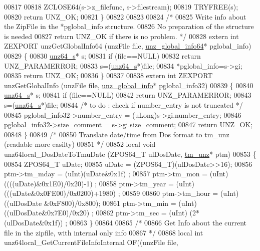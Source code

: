 \begin{DoxyCode}
00817 
00818     ZCLOSE64(s->z\_filefunc, s->filestream);
00819     TRYFREE(s);
00820     \textcolor{keywordflow}{return} UNZ\_OK;
00821 \}
00822 
00823 
00824 \textcolor{comment}{/*}
00825 \textcolor{comment}{  Write info about the ZipFile in the *pglobal\_info structure.}
00826 \textcolor{comment}{  No preparation of the structure is needed}
00827 \textcolor{comment}{  return UNZ\_OK if there is no problem. */}
00828 \textcolor{keyword}{extern} \textcolor{keywordtype}{int} ZEXPORT unzGetGlobalInfo64 (unzFile file, \hyperlink{structunz__global__info64__s}{unz\_global\_info64}* pglobal\_info)
00829 \{
00830     \hyperlink{structunz64__s}{unz64\_s}* s;
00831     \textcolor{keywordflow}{if} (file==NULL)
00832         \textcolor{keywordflow}{return} UNZ\_PARAMERROR;
00833     s=(\hyperlink{structunz64__s}{unz64\_s}*)file;
00834     *pglobal\_info=s->gi;
00835     \textcolor{keywordflow}{return} UNZ\_OK;
00836 \}
00837 
00838 \textcolor{keyword}{extern} \textcolor{keywordtype}{int} ZEXPORT unzGetGlobalInfo (unzFile file, \hyperlink{structunz__global__info__s}{unz\_global\_info}* pglobal\_info32)
00839 \{
00840     \hyperlink{structunz64__s}{unz64\_s}* s;
00841     \textcolor{keywordflow}{if} (file==NULL)
00842         \textcolor{keywordflow}{return} UNZ\_PARAMERROR;
00843     s=(\hyperlink{structunz64__s}{unz64\_s}*)file;
00844     \textcolor{comment}{/* to do : check if number\_entry is not truncated */}
00845     pglobal\_info32->number\_entry = (uLong)s->gi.number\_entry;
00846     pglobal\_info32->size\_comment = s->gi.size\_comment;
00847     \textcolor{keywordflow}{return} UNZ\_OK;
00848 \}
00849 \textcolor{comment}{/*}
00850 \textcolor{comment}{   Translate date/time from Dos format to tm\_unz (readable more easilty)}
00851 \textcolor{comment}{*/}
00852 local \textcolor{keywordtype}{void} unz64local\_DosDateToTmuDate (ZPOS64\_T ulDosDate, \hyperlink{structtm__unz__s}{tm\_unz}* ptm)
00853 \{
00854     ZPOS64\_T uDate;
00855     uDate = (ZPOS64\_T)(ulDosDate>>16);
00856     ptm->tm\_mday = (uInt)(uDate&0x1f) ;
00857     ptm->tm\_mon =  (uInt)((((uDate)&0x1E0)/0x20)-1) ;
00858     ptm->tm\_year = (uInt)(((uDate&0x0FE00)/0x0200)+1980) ;
00859 
00860     ptm->tm\_hour = (uInt) ((ulDosDate &0xF800)/0x800);
00861     ptm->tm\_min =  (uInt) ((ulDosDate&0x7E0)/0x20) ;
00862     ptm->tm\_sec =  (uInt) (2*(ulDosDate&0x1f)) ;
00863 \}
00864 
00865 \textcolor{comment}{/*}
00866 \textcolor{comment}{  Get Info about the current file in the zipfile, with internal only info}
00867 \textcolor{comment}{*/}
00868 local \textcolor{keywordtype}{int} unz64local\_GetCurrentFileInfoInternal OF((unzFile file,

\end{DoxyCode}
